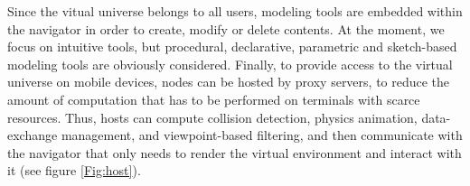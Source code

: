 Since the vitual universe belongs to all users, modeling tools are
embedded within the navigator in order to create, modify or delete
contents. At the moment, we focus on intuitive tools, but procedural,
declarative, parametric and sketch-based modeling tools are obviously
considered. Finally, to provide access to the virtual universe on
mobile devices, nodes can be hosted by proxy servers, to reduce the
amount of computation that has to be performed on terminals with
scarce resources. Thus, hosts can compute collision detection, physics
animation, data-exchange management, and viewpoint-based filtering,
and then communicate with the navigator that only needs to render the
virtual environment and interact with it (see figure \ref{Fig:host}).
